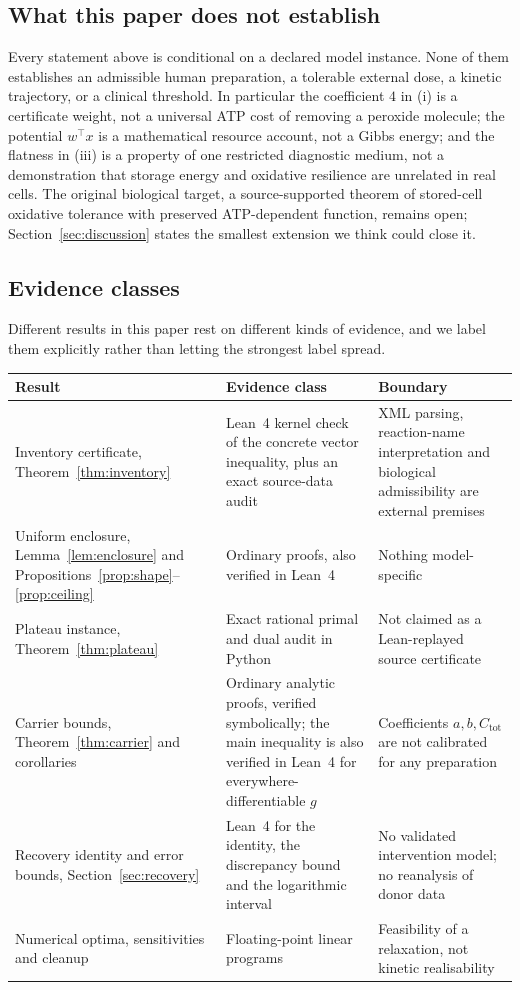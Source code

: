 \documentclass[11pt,a4paper]{article}
\theoremstyle{plain}
\theoremstyle{definition}
\theoremstyle{remark}
\newcommand{\Ctot}{C_{\mathrm{tot}}}
\begin{document}
\subsection{What this paper does not establish}
Every statement above is conditional on a declared model instance. None of them
establishes an admissible human preparation, a tolerable external dose, a
kinetic trajectory, or a clinical threshold. In particular the coefficient $4$
in (i) is a certificate weight, not a universal ATP cost of removing a peroxide
molecule; the potential $w^{\top}x$ is a mathematical resource account, not a
Gibbs energy; and the flatness in (iii) is a property of one restricted
diagnostic medium, not a demonstration that storage energy and oxidative
resilience are unrelated in real cells. The original biological target, a
source-supported theorem of stored-cell oxidative tolerance with preserved
ATP-dependent function, remains open; Section~\ref{sec:discussion} states the
smallest extension we think could close it.

\subsection{Evidence classes}
Different results in this paper rest on different kinds of evidence, and we
label them explicitly rather than letting the strongest label spread.

\begin{center}
\small
\begin{tabular}{@{}p{}p{}p{}@{}}
\toprule
Result & Evidence class & Boundary \\
\midrule
Inventory certificate, Theorem~\ref{thm:inventory} &
Lean~4 kernel check of the concrete vector inequality, plus an exact
source-data audit &
XML parsing, reaction-name interpretation and biological admissibility are
external premises \\
Uniform enclosure, Lemma~\ref{lem:enclosure} and
Propositions~\ref{prop:shape}--\ref{prop:ceiling} &
Ordinary proofs, also verified in Lean~4 &
Nothing model-specific \\
Plateau instance, Theorem~\ref{thm:plateau} &
Exact rational primal and dual audit in Python &
Not claimed as a Lean-replayed source certificate \\
Carrier bounds, Theorem~\ref{thm:carrier} and corollaries &
Ordinary analytic proofs, verified symbolically; the main inequality is also
verified in Lean~4 for everywhere-differentiable $g$ &
Coefficients $a,b,\Ctot$ are not calibrated for any preparation \\
Recovery identity and error bounds, Section~\ref{sec:recovery} &
Lean~4 for the identity, the discrepancy bound and the logarithmic interval &
No validated intervention model; no reanalysis of donor data \\
Numerical optima, sensitivities and cleanup &
Floating-point linear programs &
Feasibility of a relaxation, not kinetic realisability \\
\bottomrule
\end{tabular}
\end{center}
\end{document}
